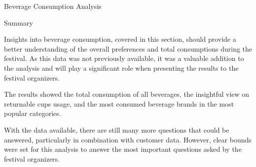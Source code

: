 \begin{section}{Beverage Consumption Analysis}
	\begin{subsection}{Summary}
		\label{subsec:analysis-beverage-consumption-summary}

		Insights into beverage consumption, covered in this section, should provide a better understanding of the overall preferences and total consumptions during the festival.
		As this data was not previously available, it was a valuable addition to the analysis and will play a significant role when presenting the results to the festival organizers.

		The results showed the total consumption of all beverages, the insightful view on returnable cups usage, and the most consumed beverage brands in the most popular categories.

		With the data available, there are still many more questions that could be answered, particularly in combination with customer data.
		However, clear bounds were set for this analysis to answer the most important questions asked by the festival organizers.
	\end{subsection}

\end{section}
\pagebreak[4]

